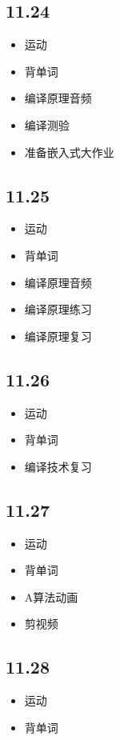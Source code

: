 \documentclass[UTF8]{ctexart}
\begin{document}
\subsection*{11.24}
\begin{itemize}
    \item 运动
    \item 背单词
    \item 编译原理音频
    \item 编译测验
    \item 准备嵌入式大作业
\end{itemize}

\subsection*{11.25}
\begin{itemize}
    \item 运动
    \item 背单词
    \item 编译原理音频
    \item 编译原理练习
    \item 编译原理复习
\end{itemize}

\subsection*{11.26}
\begin{itemize}
    \item 运动
    \item 背单词
    \item 编译技术复习
\end{itemize}

\subsection*{11.27}
\begin{itemize}
    \item 运动
    \item 背单词
    \item A算法动画
    \item 剪视频
\end{itemize}

\subsection*{11.28}
\begin{itemize}
    \item 运动
    \item 背单词
\end{itemize}
\end{document}
